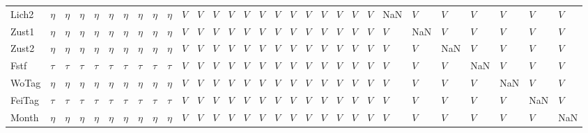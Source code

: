 \begin{tabular}{llllllllllllllllllllllllllllll}
Lich2  &    $\eta$ &    $\eta$ &    $\eta$ &    $\eta$ &    $\eta$ &    $\eta$ &    $\eta$ &    $\eta$ &    $\eta$ &     $V$ &     $V$ &     $V$ &     $V$ &     $V$ &     $V$ &     $V$ &     $V$ &     $V$ &       $V$ &     $V$ &     $V$ &     $V$ &     NaN &     $V$ &     $V$ &     $V$ &     $V$ &     $V$ &     $V$ \\
Zust1  &    $\eta$ &    $\eta$ &    $\eta$ &    $\eta$ &    $\eta$ &    $\eta$ &    $\eta$ &    $\eta$ &    $\eta$ &     $V$ &     $V$ &     $V$ &     $V$ &     $V$ &     $V$ &     $V$ &     $V$ &     $V$ &       $V$ &     $V$ &     $V$ &     $V$ &     $V$ &     NaN &     $V$ &     $V$ &     $V$ &     $V$ &     $V$ \\
Zust2  &    $\eta$ &    $\eta$ &    $\eta$ &    $\eta$ &    $\eta$ &    $\eta$ &    $\eta$ &    $\eta$ &    $\eta$ &     $V$ &     $V$ &     $V$ &     $V$ &     $V$ &     $V$ &     $V$ &     $V$ &     $V$ &       $V$ &     $V$ &     $V$ &     $V$ &     $V$ &     $V$ &     NaN &     $V$ &     $V$ &     $V$ &     $V$ \\
Fstf   &    $\tau$ &    $\tau$ &    $\tau$ &    $\tau$ &    $\tau$ &    $\tau$ &    $\tau$ &    $\tau$ &    $\tau$ &     $V$ &     $V$ &     $V$ &     $V$ &     $V$ &     $V$ &     $V$ &     $V$ &     $V$ &       $V$ &     $V$ &     $V$ &     $V$ &     $V$ &     $V$ &     $V$ &     NaN &     $V$ &     $V$ &     $V$ \\
WoTag  &    $\eta$ &    $\eta$ &    $\eta$ &    $\eta$ &    $\eta$ &    $\eta$ &    $\eta$ &    $\eta$ &    $\eta$ &     $V$ &     $V$ &     $V$ &     $V$ &     $V$ &     $V$ &     $V$ &     $V$ &     $V$ &       $V$ &     $V$ &     $V$ &     $V$ &     $V$ &     $V$ &     $V$ &     $V$ &     NaN &     $V$ &     $V$ \\
FeiTag &    $\tau$ &    $\tau$ &    $\tau$ &    $\tau$ &    $\tau$ &    $\tau$ &    $\tau$ &    $\tau$ &    $\tau$ &     $V$ &     $V$ &     $V$ &     $V$ &     $V$ &     $V$ &     $V$ &     $V$ &     $V$ &       $V$ &     $V$ &     $V$ &     $V$ &     $V$ &     $V$ &     $V$ &     $V$ &     $V$ &     NaN &     $V$ \\
Month  &    $\eta$ &    $\eta$ &    $\eta$ &    $\eta$ &    $\eta$ &    $\eta$ &    $\eta$ &    $\eta$ &    $\eta$ &     $V$ &     $V$ &     $V$ &     $V$ &     $V$ &     $V$ &     $V$ &     $V$ &     $V$ &       $V$ &     $V$ &     $V$ &     $V$ &     $V$ &     $V$ &     $V$ &     $V$ &     $V$ &     $V$ &     NaN \\
\bottomrule
\end{tabular}
